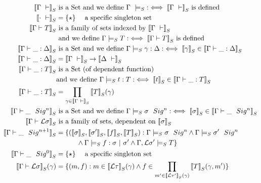 \begin{align*}
  \denotesS{\goodCtx{\Gamma}{i}} & \text{ is a Set and we define } \goodCtxS{\Gamma}{i} :\iff \denotesS{\goodCtx{\Gamma}{i}} \text{ is defined} \\
  \denotesS{\goodCtx{\cdot}{i}} &= \{\star\} \quad \text{ a specific singleton set} \\
  \denotesS{\goodType{\Gamma}{T}{i}} & \text{ is a family of sets indexed by } \denotesS{\goodCtx{\Gamma}{i}} \\
  & \text{ and we define } \goodTypeS{\Gamma}{T}{i} : \iff \denotesS{\goodType{\Gamma}{T}{i}} \text{ is defined } \\
  \denotesS{\goodSub{\Gamma}{\_}{\Delta}} & \text{ is a Set and we define }  {\goodSubS{\Gamma}{\gamma}{\Delta}} : \iff \denotesS{\gamma} \in \denotesS{\goodSub{\Gamma}{\_}{\Delta}} \\
  \denotesS{\goodSub{\Gamma}{\_}{\Delta}} & = \denotesS{\goodCtx{\Gamma}{i}} \rightarrow \denotesS{\goodCtx{\Delta}{j}} \\
  \denotesS{\goodTerm{\Gamma}{\_}{T}} & \text{ is a Set (of dependent function) } \\& \text{and we define }  {\goodTermS{\Gamma}{t}{T}} : \iff \denotesS{t} \in \denotesS{\goodTerm{\Gamma}{\_}{T}} \\
  \denotesS{\goodTerm{\Gamma}{\_}{T}} & = \prod_{\gamma \in \denotesS{\goodCtx{\Gamma}{i}}}\denotesS{T}(\gamma) \\
  \denotesS{\goodSig{\Gamma}{\_}{n}} & \text{ is a Set  and we define  } {\goodSigS{\Gamma}{\sigma}{n}} :\iff \denotesS{\sigma} \in  \denotesS{\goodSig{\Gamma}{\_}{n}} \\
  \denotesS{\goodType{\Gamma}{\cL \sigma}{i}} & \text{ is a family of sets, dependent on } \denotesS{\sigma}  \\
  \denotesS{\goodSig{\Gamma}{\_}{n+1}} &= \{
    (\denotesS{\sigma}, \denotesS{\sigma'}, \denotesS{f}, \denotesS{T}) :
      {\goodSigS{\Gamma}{\sigma}{n}}
      \land  {\goodSigS{\Gamma}{\sigma'}{n}} \\  
      & \quad \quad \quad \land  {\goodSealS{\Gamma}{f}{\sigma}{\sigma'}}
      \land  {\goodTypeS{\Gamma, \cL \sigma'}{T}{i}} 
  \} \\ 
  \denotesS{\goodSig{\Gamma}{\_}{0}} &= \{\star\} \quad \text{ a specific singleton set} \\
  \denotesS{\goodType{\Gamma}{\cL \sigma}{i}} (\gamma)&= \{(m, f) :  m \in \denotesS{\cL \tau}(\gamma) \land f \in \prod_{m' \in \denotesS{\cL \tau'}(\gamma)}\denotesS{T}(\gamma, m')  \}  \\

\end{align*}
